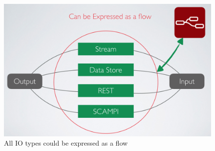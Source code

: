 \begin{figure}[H]
	\centering
	\includegraphics[scale=0.5]{images/IO.png}
	\caption{All IO types could be expressed as a flow}
	\label{fig:io}
\end{figure}

